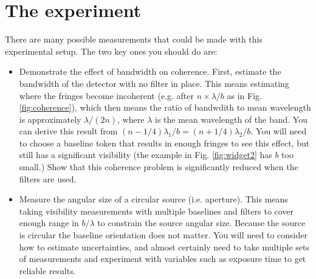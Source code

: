 \documentclass[11pt]{article}
\begin{document}
\clearpage
\section{The experiment}

There are many possible measurements that could be made with this experimental setup. The two key ones you should do are:
\begin{itemize}
    \item Demonstrate the effect of bandwidth on coherence. First, estimate the bandwidth of the detector with no filter in place. This means estimating where the fringes become incoherent (e.g. after $n \times \lambda/b$ as in Fig. \ref{fig:coherence}), which then means the ratio of bandwdith to mean wavelength is approximately $\lambda/(2n)$, where $\lambda$ is the mean wavelength of the band. You can derive this result from $(n-1/4)\lambda_1/b = (n+1/4)\lambda_2/b$. You will need to choose a baseline token that results in enough fringes to see this effect, but still has a significant visibility (the example in Fig. \ref{fig:widget2} has $b$ too small.) Show that this coherence problem is significantly reduced when the filters are used.
    \item Measure the angular size of a circular source (i.e. aperture). This means taking visibility measurements with multiple baselines and filters to cover enough range in $b/\lambda$ to constrain the source angular size. Because the source is circular the baseline orientation does not matter. You will need to consider how to estimate uncertainties, and almost certainly need to take multiple sets of measurements and experiment with variables such as exposure time to get reliable results.
\end{itemize}
\end{document}
